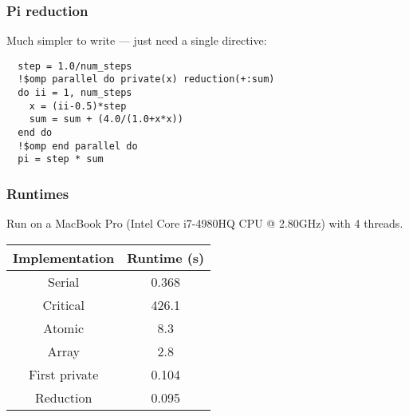 \documentclass{beamer}
\begin{document}
\begin{frame}[fragile]
\frametitle{Pi reduction}
Much simpler to write --- just need a single directive:
\begin{verbatim}
  step = 1.0/num_steps
  !$omp parallel do private(x) reduction(+:sum)
  do ii = 1, num_steps
    x = (ii-0.5)*step
    sum = sum + (4.0/(1.0+x*x))
  end do
  !$omp end parallel do
  pi = step * sum
\end{verbatim}
\end{frame}

\begin{frame}
\frametitle{Runtimes}
Run on a MacBook Pro (Intel Core i7-4980HQ CPU @ 2.80GHz) with 4 threads.

\begin{table}
\begin{tabular}{cc}
\toprule
Implementation & Runtime (s) \\
\midrule
Serial        & 0.368 \\
Critical      & 426.1 \\
Atomic        & 8.3 \\
Array         & 2.8 \\
First private & 0.104 \\
Reduction     & 0.095 \\
\bottomrule
\end{tabular}
\end{table}
\end{frame}

\end{document}
